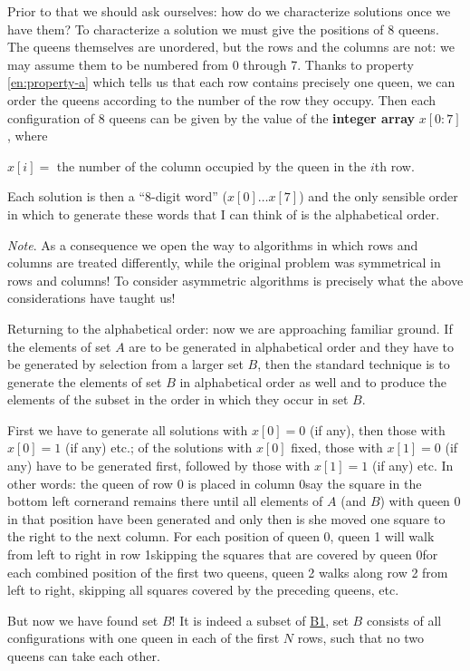 \documentclass[twoside,11pt]{book}
\begin{document}
Prior to that we should ask ourselves: how do we characterize solutions once we have them? To characterize a solution we must give the positions of 8 queens. The queens themselves are unordered, but the rows and the columns are not: we may assume them to be numbered from 0 through 7. Thanks to property \ref{en:property-a} which tells us that each row contains precisely one queen, we can order the queens according to the number of the row they occupy. Then each configuration of 8 queens can be given by the value of the \textbf{integer array} $x[0:7]$, where

\noindent
$x[i] =$ the number of the column occupied by the queen in the $i$th row.

Each solution is then a ``8-digit word'' ($x[0] \dots x[7]$) and the only sensible order in which to generate these words that I can think of is the alphabetical order.

\noindent
\textit{Note}. As a consequence we open the way to algorithms in which rows and columns are treated differently, while the original problem was symmetrical in rows and columns! To consider asymmetric algorithms is precisely what the above considerations have taught us!

Returning to the alphabetical order: now we are approaching familiar ground. If the elements of set $A$ are to be generated in alphabetical order and they have to be generated by selection from a larger set $B$, then the standard technique is to generate the elements of set $B$ in alphabetical order as well and to produce the elements of the subset in the order in which they occur in set $B$.

First we have to generate all solutions with $x[0] = 0$ (if any), then those with $x[0] = 1$ (if any) etc.; of the solutions with $x[0]$ fixed, those with $x[1] = 0$ (if any) have to be generated first, followed by those with $x[1] = 1$ (if any) etc. In other words: the queen of row 0 is placed in column 0\textemdash{}say the square in the bottom left corner\textemdash{}and remains there until all elements of $A$ (and $B$) with queen 0 in that position have been generated and only then is she moved one square to the right to the next column. For each position of queen 0, queen 1 will walk from left to right in row 1\textemdash{}skipping the squares that are covered by queen 0\textemdash{}for each combined position of the first two queens, queen 2 walks along row 2 from left to right, skipping all squares covered by the preceding queens, etc.

But now we have found set $B$! It is indeed a subset of \hyperref[en:b1-eight-queens]{B1}, set $B$ consists of all configurations with one queen in each of the first $N$ rows, such that no two queens can take each other.
\end{document}
